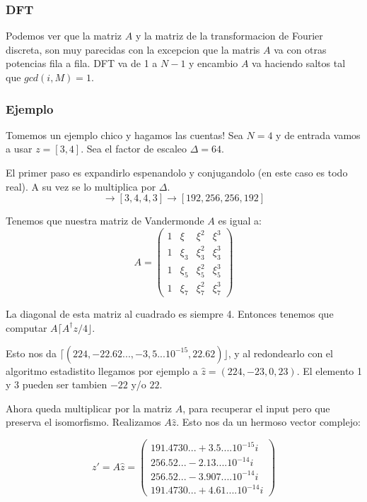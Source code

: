 \documentclass[12pt, oneside]{article}
\begin{document}
\subsubsection{DFT}
Podemos ver que la matriz $A$  y la matriz de la transformacion de Fourier discreta,
son muy parecidas con la excepcion que la matris $A$ va con otras potencias fila a fila.
DFT va de 1 a $N-1$  y encambio $A$ va haciendo saltos tal que $gcd(i,M)=1$.

\subsubsection{Ejemplo}

Tomemos un ejemplo chico y hagamos las cuentas!
Sea $N=4$ y de entrada vamos a usar $z=[3,4]$.
Sea el factor de escaleo $\Delta=64$.

El primer paso es expandirlo espenandolo y conjugandolo (en este caso es todo real).
A su vez se lo multiplica por  $\Delta$.
\begin{equation*}
    [3,4]\rightarrow [3,4,4,3] \rightarrow [192, 256, 256, 192]
\end{equation*}

Tenemos que nuestra matriz de Vandermonde $A$ es igual a:
\begin{equation*}
    A=
    \begin{pmatrix}
        1 & \xi &  \xi^2 &  \xi^3 \\
        1 & \xi_3 & \xi_3^2 &\xi_3^3\\
        1 & \xi_5 & \xi_5^2 &\xi_5^3\\
        1 & \xi_7 & \xi_7^2 &\xi_7^3
    \end{pmatrix}
    \label{eq:vandermonde_ej}
\end{equation*}

La diagonal de esta matriz al cuadrado es siempre 4.
Entonces tenemos que computar $A\lceil A^\dagger z/4  \rfloor$.

Esto nos da $\lceil(224, -22.62..., -3,5...10^{-15}, 22.62)\rfloor$, y al redondearlo
con el algoritmo estadistito llegamos por ejemplo a $\hat{z}=(224, -23, 0, 23)$.
El elemento 1 y 3 pueden ser tambien $-22$ y/o $22$.


Ahora queda multiplicar por la matriz $A$, para recuperar el input pero que preserva
el isomorfismo.
Realizamos $A\hat{z}$.
Esto nos da un hermoso vector complejo:

\begin{equation*}
    z'= A\hat{z}=
    \begin{pmatrix}
        191.4730... + 3.5....10^{-15}i \\
        256.52... - 2.13....10^{-14}i \\
        256.52... - 3.907....10^{-14}i \\
        191.4730... + 4.61....10^{-14}i
    \end{pmatrix}
    \label{eq:vandermonde_ej}
\end{equation*}
\end{document}
